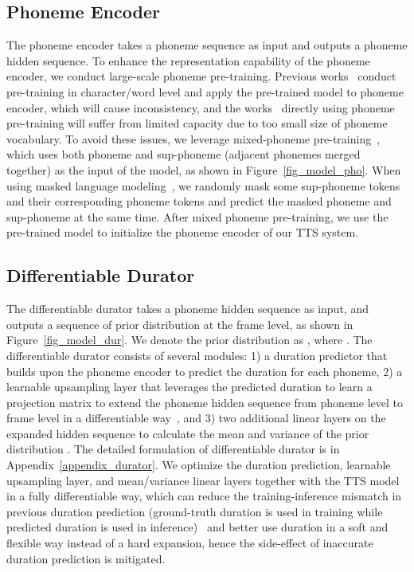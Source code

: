\documentclass{article}
\theoremstyle{definition}
\begin{document}
\subsection{Phoneme Encoder}
\label{sec_phoneme_pretrain}
The phoneme encoder  takes a phoneme sequence  as input and outputs a phoneme hidden sequence. To enhance the representation capability of the phoneme encoder, we conduct large-scale phoneme pre-training. Previous works~\citep{xiao2020improving} conduct pre-training in character/word level and apply the pre-trained model to phoneme encoder, which will cause inconsistency, and the works~\citep{jia2021png} directly using phoneme pre-training will suffer from limited capacity due to too small size of phoneme vocabulary. To avoid these issues, we leverage mixed-phoneme pre-training~\citep{zhang2022mixed}, which uses both phoneme and sup-phoneme (adjacent phonemes merged together) as the input of the model, as shown in Figure~\ref{fig_model_pho}. When using masked language modeling~\cite{devlin2018bert}, we randomly mask some sup-phoneme tokens and their corresponding phoneme tokens and predict the masked phoneme and sup-phoneme at the same time. After mixed phoneme pre-training, we use the pre-trained model to initialize the phoneme encoder of our TTS system.

\subsection{Differentiable Durator}
\label{sec_diff_durator}

The differentiable durator  takes a phoneme hidden sequence as input, and outputs a sequence of prior distribution at the frame level, as shown in Figure~\ref{fig_model_dur}. We denote the prior distribution as , where . The differentiable durator  consists of several modules: 1) a duration predictor that builds upon the phoneme encoder to predict the duration for each phoneme, 2) a learnable upsampling layer that leverages the predicted duration to learn a projection matrix to extend the phoneme hidden sequence from phoneme level to frame level in a differentiable way~\citep{elias2021parallel}, and 3) two additional linear layers on the expanded hidden sequence to calculate the mean and variance of the prior distribution . The detailed formulation of differentiable durator is in Appendix~\ref{appendix_durator}.
We optimize the duration prediction, learnable upsampling layer, and mean/variance linear layers together with the TTS model in a fully differentiable way, which can reduce the training-inference mismatch in previous duration prediction (ground-truth duration is used in training while predicted duration is used in inference)~\citep{kim2020glow,kim2021conditional,ren2021fastspeech} and better use duration in a soft and flexible way instead of a hard expansion, hence the side-effect of inaccurate duration prediction is mitigated. 
\end{document}

